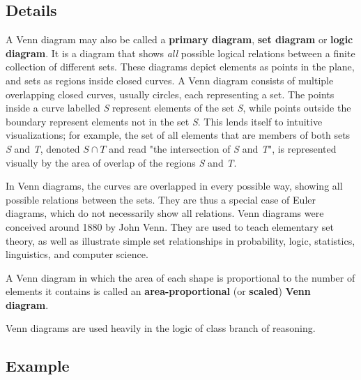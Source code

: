 \subsection{Details}
\label{sss:deta-2779}




A Venn diagram may also be called a \textbf{primary diagram}, \textbf{set diagram} or
\textbf{logic diagram}. It is a diagram that shows \textit{all} possible logical relations
between a finite collection of different sets. These diagrams depict elements as points in
the plane, and sets as regions inside closed curves. A Venn diagram consists of multiple
overlapping closed curves, usually circles, each representing a set. The points inside a
curve labelled \textit{S} represent elements of the set \textit{S}, while points outside
the boundary represent elements not in the set \textit{S}. This lends itself to intuitive
visualizations; for example, the set of all elements that are members of both sets
\textit{S} and \textit{T}, denoted $S \cap T$ and read "the intersection of \textit{S} and
\textit{T}", is represented visually by the area of overlap of the regions \textit{S} and
\textit{T}.



In Venn diagrams, the curves are overlapped in every possible way, showing all possible
relations between the sets. They are thus a special case of Euler diagrams, which do not
necessarily show all relations. Venn diagrams were conceived around 1880 by John Venn.
They are used to teach elementary set theory, as well as illustrate simple set
relationships in probability, logic, statistics, linguistics, and computer science.



A Venn diagram in which the area of each shape is proportional to the number of elements
it contains is called an \textbf{area-proportional} (or \textbf{scaled}) \textbf{Venn
diagram}.



Venn diagrams are used heavily in the logic of class branch of reasoning.




\subsection{Example}
\label{sss:exam-1a79}




